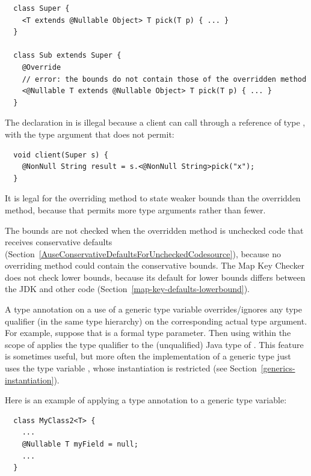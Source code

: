 \begin{Verbatim}
  class Super {
    <T extends @Nullable Object> T pick(T p) { ... }
  }

  class Sub extends Super {
    @Override
    // error: the bounds do not contain those of the overridden method
    <@Nullable T extends @Nullable Object> T pick(T p) { ... }
  }
\end{Verbatim}

The declaration in  is illegal because a client can call
 through a reference of type , with the type argument
 that  does not permit:

\begin{Verbatim}
  void client(Super s) {
    @NonNull String result = s.<@NonNull String>pick("x");
  }
\end{Verbatim}

It is legal for the overriding method to state weaker bounds than the
overridden method, because that permits more type arguments rather than fewer.

The bounds are not checked when the overridden method is unchecked code that
receives conservative defaults
(Section~\ref{AuseConservativeDefaultsForUncheckedCodesource}), because no
overriding method could contain the conservative bounds.  The Map Key Checker
does not check lower bounds, because its default for lower bounds differs
between the JDK and other code (Section~\ref{map-key-defaults-lowerbound}).



A type annotation on a use of a generic type variable overrides/ignores any type
qualifier (in the same type hierarchy) on the corresponding actual type
argument.  For example, suppose that  is a formal type parameter.
Then using  within the scope of  applies the type
qualifier  to the (unqualified) Java type of \@.
This feature is sometimes useful, but more often the implementation of a
generic type just uses the type variable , whose instantiation is
restricted (see Section~\ref{generics-instantiation}).

Here is an example of applying a type annotation to a generic type
variable:

\begin{Verbatim}
  class MyClass2<T> {
    ...
    @Nullable T myField = null;
    ...
  }
\end{Verbatim}

